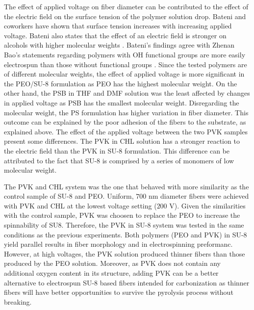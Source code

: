The effect of applied voltage on fiber diameter can be contributed to the effect of the electric field on the surface tension of the polymer solution drop. Bateni and coworkers \cite{Bateni2005} have shown that surface tension increases with increasing applied voltage. Bateni also states that the effect of an electric field is stronger on alcohols with higher molecular weights \cite{Bateni2005}. Bateni's findings agree with Zhenan Bao's statements regarding polymers with OH functional groups are more easily electrospun than those without functional groups \cite{Liu2015a, Bateni2005}. Since the tested polymers are of different molecular weights, the effect of applied voltage is more significant in the PEO/SU-8 formulation as PEO has the highest molecular weight. On the other hand, the PSB in THF and DMF solution was the least affected by changes in applied voltage as PSB has the smallest molecular weight. Disregarding the molecular weight, the PS formulation has higher variation in fiber diameter. This outcome can be explained by the poor adhesion of the fibers to the substrate, as explained above. The effect of the applied voltage between the two PVK samples present some differences. The PVK in CHL solution has a stronger reaction to the electric field than the PVK in SU-8 formulation. This difference can be attributed to the fact that SU-8 is comprised by a series of monomers of low molecular weight.

The PVK and CHL system was the one that behaved with more similarity as the control sample of SU-8 and PEO. Uniform, $700 \textrm{ nm}$ diameter fibers were achieved with PVK and CHL at the lowest voltage setting ($200 \textrm{ V}$). Given the similarities with the control sample, PVK was choosen to replace the PEO to increase the spinnability of SU8. Therefore, the PVK in SU-8 system was tested in the same conditions as the previous experiments. Both polymers (PEO and PVK) in SU-8 yield parallel results in fiber morphology and in electrospinning preformanc. However, at high voltages, the PVK solution produced thinner fibers than those produced by the PEO solution. Moreover, as PVK does not contain any additional oxygen content in its structure, adding PVK can be a better alternative to electrospun SU-8 based fibers intended for carbonization as thinner fibers will have better opportunities to survive the pyrolysis process without breaking.

